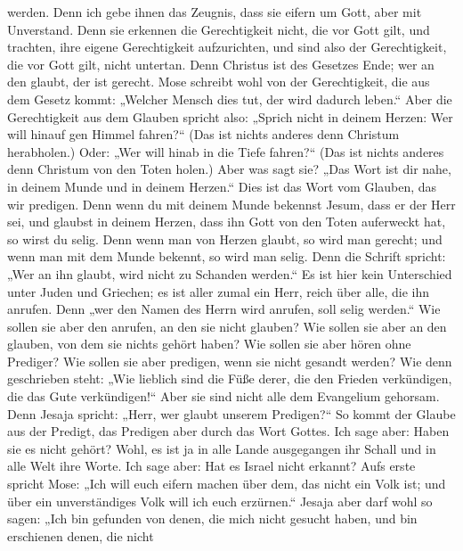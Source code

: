 werden.  Denn ich gebe ihnen das Zeugnis, dass sie eifern um
Gott, aber mit Unverstand.  Denn sie erkennen die
Gerechtigkeit nicht, die vor Gott gilt, und trachten, ihre eigene
Gerechtigkeit aufzurichten, und sind also der Gerechtigkeit, die vor
Gott gilt, nicht untertan.  Denn Christus ist des Gesetzes
Ende; wer an den glaubt, der ist gerecht.  Mose schreibt
wohl von der Gerechtigkeit, die aus dem Gesetz kommt: „Welcher Mensch
dies tut, der wird dadurch leben.``  Aber die Gerechtigkeit
aus dem Glauben spricht also: „Sprich nicht in deinem Herzen: Wer will
hinauf gen Himmel fahren?{}`` (Das ist nichts anderes denn Christum
herabholen.)  Oder: „Wer will hinab in die Tiefe fahren?{}``
(Das ist nichts anderes denn Christum von den Toten holen.) 
Aber was sagt sie? „Das Wort ist dir nahe, in deinem Munde und in deinem
Herzen.`` Dies ist das Wort vom Glauben, das wir predigen. 
Denn wenn du mit deinem Munde bekennst Jesum, dass er der Herr sei, und
glaubst in deinem Herzen, dass ihn Gott von den Toten auferweckt hat, so
wirst du selig.  Denn wenn man von Herzen glaubt, so wird
man gerecht; und wenn man mit dem Munde bekennt, so wird man selig.
 Denn die Schrift spricht: „Wer an ihn glaubt, wird nicht
zu Schanden werden.``  Es ist hier kein Unterschied unter
Juden und Griechen; es ist aller zumal ein Herr, reich über alle, die
ihn anrufen.  Denn „wer den Namen des Herrn wird anrufen,
soll selig werden.``  Wie sollen sie aber den anrufen, an
den sie nicht glauben? Wie sollen sie aber an den glauben, von dem sie
nichts gehört haben? Wie sollen sie aber hören ohne Prediger?
 Wie sollen sie aber predigen, wenn sie nicht gesandt
werden? Wie denn geschrieben steht: „Wie lieblich sind die Füße derer,
die den Frieden verkündigen, die das Gute verkündigen!{}`` 
Aber sie sind nicht alle dem Evangelium gehorsam. Denn Jesaja spricht:
„Herr, wer glaubt unserem Predigen?{}``  So kommt der
Glaube aus der Predigt, das Predigen aber durch das Wort Gottes.
 Ich sage aber: Haben sie es nicht gehört? Wohl, es ist ja
in alle Lande ausgegangen ihr Schall und in alle Welt ihre Worte.
 Ich sage aber: Hat es Israel nicht erkannt? Aufs erste
spricht Mose: „Ich will euch eifern machen über dem, das nicht ein Volk
ist; und über ein unverständiges Volk will ich euch erzürnen.``
 Jesaja aber darf wohl so sagen: „Ich bin gefunden von
denen, die mich nicht gesucht haben, und bin erschienen denen, die nicht
